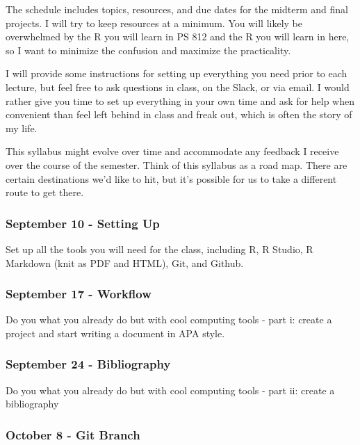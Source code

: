 \documentclass[11pt,]{article}
\begin{document}
The schedule includes topics, resources, and due dates for the midterm
and final projects. I will try to keep resources at a minimum. You will
likely be overwhelmed by the R you will learn in PS 812 and the R you
will learn in here, so I want to minimize the confusion and maximize the
practicality.

I will provide some instructions for setting up everything you need
prior to each lecture, but feel free to ask questions in class, on the
Slack, or via email. I would rather give you time to set up everything
in your own time and ask for help when convenient than feel left behind
in class and freak out, which is often the story of my life.

This syllabus might evolve over time and accommodate any feedback I
receive over the course of the semester. Think of this syllabus as a
road map. There are certain destinations we'd like to hit, but it's
possible for us to take a different route to get there.

\hypertarget{september-10---setting-up}{%
\subsubsection{September 10 - Setting
Up}\label{september-10---setting-up}}

Set up all the tools you will need for the class, including R, R Studio,
R Markdown (knit as PDF and HTML), Git, and Github.

\hypertarget{september-17---workflow}{%
\subsubsection{September 17 - Workflow}\label{september-17---workflow}}

Do you what you already do but with cool computing tools - part i:
create a project and start writing a document in APA style.

\hypertarget{september-24---bibliography}{%
\subsubsection{September 24 -
Bibliography}\label{september-24---bibliography}}

Do you what you already do but with cool computing tools - part ii:
create a bibliography

\hypertarget{october-8---git-branch}{%
\subsubsection{October 8 - Git Branch}\label{october-8---git-branch}}
\end{document}
